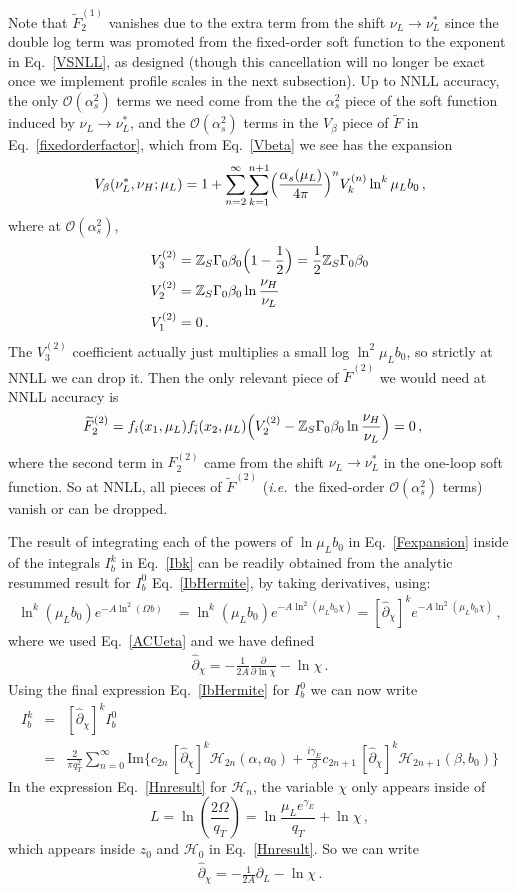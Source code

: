 \documentclass[a4,letterpaper,11pt]{article}
\newcommand{\nn}{\nonumber}
\newcommand{\be}{\begin{equation}}
\newcommand{\ee}{\end{equation}}
\newcommand{\bea}{\begin{eqnarray}}
\newcommand{\eea}{\end{eqnarray}}
\newcommand{\as}{\alpha_s}
\newcommand{\ie}{\emph{i.e.}~}
\newcommand{\cO}{\mathcal{O}}
\newcommand{\cH}{\mathcal{H}}
\newcommand{\zed}{\mathbb{Z}}
\newcommand{\wt}{\widetilde}
\newcommand{\eq}[1]{Eq.~\eqref{#1}}
\begin{document}
Note that $\wt F_2^{(1)}$ vanishes due to the extra term from the shift $\nu_L\to \nu_L^*$ since the double log term was promoted from the fixed-order soft function to the exponent in \eq{VSNLL}, as designed (though this cancellation will no longer be exact once we implement profile scales in the next subsection). Up to NNLL accuracy, the only $\cO(\as^2)$ terms we need come from the the $\as^2$ piece of the soft function induced by $\nu_L\to\nu_L^*$, and the $\cO(\as^2)$ terms in the $V_\beta$ piece of $\wt F$ in \eq{fixedorderfactor}, which from \eq{Vbeta} we see has the expansion
\be
V_\beta(\nu_L^*,\nu_H;\mu_L) = 1+ \sum_{n=2}^\infty \sum_{k=1}^{n+1} \Bigl(\frac{\as(\mu_L)}{4\pi}\Bigr)^n V^{(n)}_k \ln^k \mu_L b_0 \,,
\ee
where at $\cO(\as^2)$,
\begin{align}
V^{(2)}_3 &= \zed _S\Gamma_0 \beta_0 \Bigl(1-\frac{1}{2}\Bigr) = \frac{1}{2} \zed _S\Gamma_0 \beta_0 \\
V^{(2)}_2 &= \zed_S \Gamma_0 \beta_0 \ln\frac{\nu_H}{\nu_L}  \nn \\
V^{(2)}_1 &= 0\,. \nn
\end{align}
The $V_3^{(2)}$ coefficient actually just multiplies a small log $\ln^2\mu_L b_0$, so strictly at NNLL we can drop it.
Then the only relevant piece of $\wt F^{(2)}$ we would need at NNLL accuracy is
\begin{align}
\label{Ftwoloop}
\wt F^{(2)}_2 &= f_i(x_1,\mu_L) f_{\bar i}(x_2,\mu_L)  \Bigl(V_{2}^{(2)}  - \zed_S\Gamma_0\beta_0 \ln\frac{\nu_H}{\nu_L}\Bigr) = 0\,,
\end{align}
where the second term in $F_2^{(2)}$ came from the shift $\nu_L\to \nu_L^*$ in the one-loop soft function. So at NNLL, all pieces of $\wt F^{(2)}$ (\ie the fixed-order $\cO(\as^2)$ terms) vanish or can be dropped.

The result of integrating each of the powers of $\ln\mu_L b_0$ in \eq{Fexpansion} inside of the integrals $I_b^k$ in \eq{Ibk} can be readily obtained from the analytic resummed result for $I_b^0$ \eq{IbHermite}, by taking derivatives, using:
\begin{align}
\label{logderivatives}
\ln^k(\mu_L b_0) e^{-A \ln^2( \Omega b)} &= \ln^k (\mu_L b_0) e^{-A \ln^2( \mu_L b_0 \chi)} = \left[ \hat \partial_{\chi} \right]^{k} e^{-A \ln^2( \mu_L b_0 \chi)}\,, 
\end{align}
where we used \eq{ACUeta} and we have defined
\bea
\hat \partial_{\chi} = -\frac{1}{2A} \frac{\partial}{\partial \ln \chi}-  \ln \chi\,.
\eea
Using the final expression \eq{IbHermite} for $I_b^0$ we can now write 
\bea\label{Ibk-cH}
I_b^k &=& \left[ \hat \partial_{\chi} \right]^k I_b^0 \nn\\
 &=&  \frac{2}{\pi q_T^2}\sum_{n=0}^{\infty} \text{Im}\Big \{c_{2n} \, \left[ \hat \partial_{\chi} \right]^k\mathcal{H}_{2n}(\alpha,a_0)+ \frac{i\gamma_E}{\beta}c_{2n+1} \,  \left[ \hat \partial_{\chi} \right]^k\mathcal{H}_{2n+1} (\beta,b_0) \Big\}
\eea
In the expression \eq{Hnresult} for $\cH_{n}$, the variable $\chi$ only appears inside of 
\be
\label{Lchi}
L = \ln \left(\frac{2\Omega}{q_T}\right) = \ln\frac{\mu_L e^{\gamma_E}}{q_T} + \ln \chi\,,
\ee
which appears inside $z_0$ and $\cH_0$ in \eq{Hnresult}.
So we can write 
\bea
\label{partialchiL}
 \hat \partial_{\chi} =  -\frac{1}{2A} \partial_{L} - \ln\chi\,.
\eea
\end{document}
